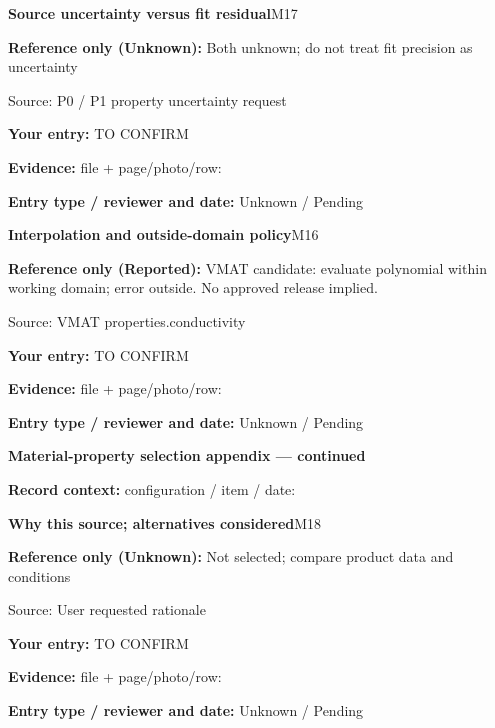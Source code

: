 \documentclass[11pt]{article}
\begin{document}
\par\noindent\begin{minipage}{\textwidth}\small
{\color{navy}\bfseries Source uncertainty versus fit residual}\hfill M17\par
\colorbox{pale}{\parbox{\dimexpr\linewidth-2\fboxsep\relax}{
\textbf{Reference only (Unknown):} Both unknown; do not treat fit precision as uncertainty\par
{\footnotesize Source: P0 / P1 property uncertainty request}}}\par
\textbf{Your entry:} {\color{muted}TO CONFIRM}\enspace\hrulefill\par
{\footnotesize\textbf{Evidence:} file + page/photo/row: \hrulefill\par
\textbf{Entry type / reviewer and date:} Unknown / Pending\par
}\end{minipage}\par\vspace{5pt}
\par\noindent\begin{minipage}{\textwidth}\small
{\color{navy}\bfseries Interpolation and outside-domain policy}\hfill M16\par
\colorbox{pale}{\parbox{\dimexpr\linewidth-2\fboxsep\relax}{
\textbf{Reference only (Reported):} VMAT candidate: evaluate polynomial within working domain; error outside. No approved release implied.\par
{\footnotesize Source: VMAT properties.conductivity}}}\par
\textbf{Your entry:} {\color{muted}TO CONFIRM}\enspace\hrulefill\par
{\footnotesize\textbf{Evidence:} file + page/photo/row: \hrulefill\par
\textbf{Entry type / reviewer and date:} Unknown / Pending\par
}\end{minipage}\par\vspace{5pt}
\clearpage
{\large\bfseries Material-property selection appendix --- continued}\par
\textbf{Record context:} configuration / item / date: \hrulefill\par
\par\noindent\begin{minipage}{\textwidth}\small
{\color{navy}\bfseries Why this source; alternatives considered}\hfill M18\par
\colorbox{pale}{\parbox{\dimexpr\linewidth-2\fboxsep\relax}{
\textbf{Reference only (Unknown):} Not selected; compare product data and conditions\par
{\footnotesize Source: User requested rationale}}}\par
\textbf{Your entry:} {\color{muted}TO CONFIRM}\enspace\hrulefill\par
{\footnotesize\textbf{Evidence:} file + page/photo/row: \hrulefill\par
\textbf{Entry type / reviewer and date:} Unknown / Pending\par
}\end{minipage}\par\vspace{5pt}
\end{document}
